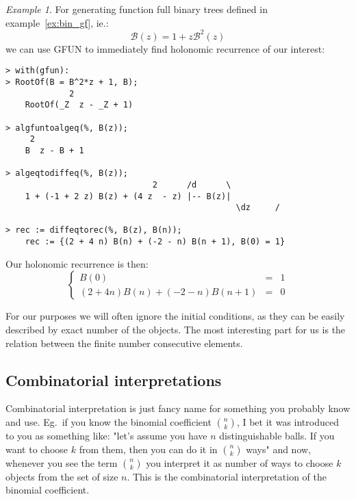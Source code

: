 \documentclass[final]{article}
\theoremstyle{definition}
\theoremstyle{remark}
\newtheorem{example}{Example}[subsection]
\newcommand{\gf}[1]{\ensuremath{\mathcal{#1}}}
\begin{document}
\begin{example}
    \label{ex:gfun-rec}
    For generating function full binary trees defined in example\ \ref{ex:bin_gf}, ie.:
    \[\gf{B}(z) = 1 + z\gf{B}^2(z)\]
    we can use GFUN\cite{gfun} to immediately find holonomic recurrence of our interest:

    \begin{lstlisting}
> with(gfun):
> RootOf(B = B^2*z + 1, B);
             2
    RootOf(_Z  z - _Z + 1)

> algfuntoalgeq(%, B(z));
     2
    B  z - B + 1

> algeqtodiffeq(%, B(z));
                              2      /d      \
    1 + (-1 + 2 z) B(z) + (4 z  - z) |-- B(z)|
                                               \dz     /

> rec := diffeqtorec(%, B(z), B(n));
    rec := {(2 + 4 n) B(n) + (-2 - n) B(n + 1), B(0) = 1}
    \end{lstlisting}

    Our holonomic recurrence is then:
    \[\left\{\begin{array}{rcl}
                B(0) &=& 1\\
                (2 + 4 n) B(n) + (-2 - n) B(n + 1) &=& 0
    \end{array}\right.\]

    For our purposes we will often ignore the initial conditions, as they can be easily described by exact number of the objects. The most interesting part for us is the relation between the finite number consecutive elements.

\end{example}

\subsection{Combinatorial interpretations}%
\label{sub:combinatorial_interpretations}

Combinatorial interpretation is just fancy name for something you probably know and use. Eg.\ if you know the binomial coefficient \(\binom{n}{k}\), I bet it was introduced to you as something like: "let's assume you have \(n\) distinguishable balls. If you want to choose \(k\) from them, then you can do it in \(\binom{n}{k}\) ways" and now, whenever you see the term \(\binom{n}{k}\) you interpret it as number of ways to choose \(k\) objects from the set of size \(n\). This is the combinatorial interpretation of the binomial coefficient.
\end{document}
